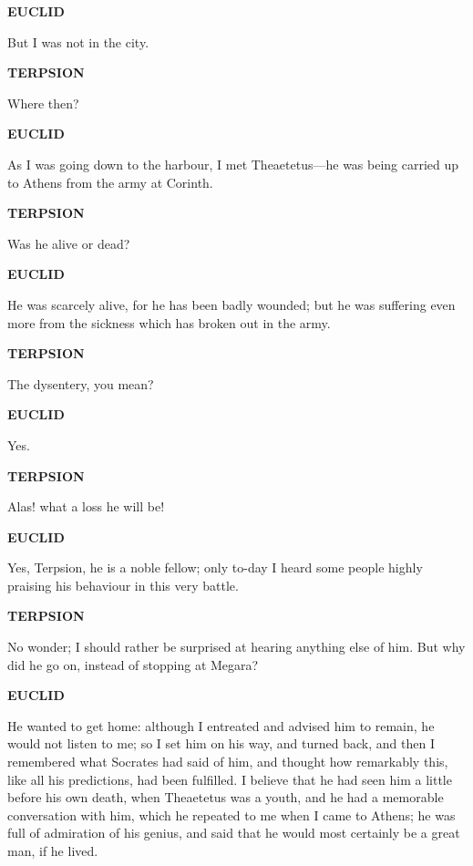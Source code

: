 \documentclass[11pt,letter]{article}
\begin{document}
\par \textbf{EUCLID}
\par   But I was not in the city.

\par \textbf{TERPSION}
\par   Where then?

\par \textbf{EUCLID}
\par   As I was going down to the harbour, I met Theaetetus—he was being carried up to Athens from the army at Corinth.

\par \textbf{TERPSION}
\par   Was he alive or dead?

\par \textbf{EUCLID}
\par   He was scarcely alive, for he has been badly wounded; but he was suffering even more from the sickness which has broken out in the army.

\par \textbf{TERPSION}
\par   The dysentery, you mean?

\par \textbf{EUCLID}
\par   Yes.

\par \textbf{TERPSION}
\par   Alas! what a loss he will be!

\par \textbf{EUCLID}
\par   Yes, Terpsion, he is a noble fellow; only to-day I heard some people highly praising his behaviour in this very battle.

\par \textbf{TERPSION}
\par   No wonder; I should rather be surprised at hearing anything else of him. But why did he go on, instead of stopping at Megara?

\par \textbf{EUCLID}
\par   He wanted to get home:  although I entreated and advised him to remain, he would not listen to me; so I set him on his way, and turned back, and then I remembered what Socrates had said of him, and thought how remarkably this, like all his predictions, had been fulfilled. I believe that he had seen him a little before his own death, when Theaetetus was a youth, and he had a memorable conversation with him, which he repeated to me when I came to Athens; he was full of admiration of his genius, and said that he would most certainly be a great man, if he lived.
\end{document}
